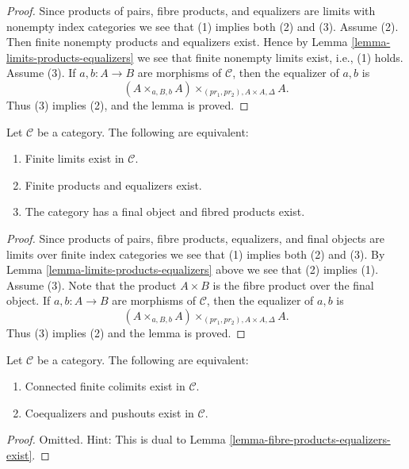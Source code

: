 \begin{proof}
Since products of pairs, fibre products, and equalizers are limits with
nonempty index categories we see that (1) implies both (2) and (3).
Assume (2). Then finite nonempty products and equalizers exist. Hence by
Lemma \ref{lemma-limits-products-equalizers}
we see that finite nonempty limits exist, i.e., (1) holds. Assume (3).
If $a, b : A \to B$ are morphisms of $\mathcal{C}$, then the
equalizer of $a, b$ is
$$
(A \times_{a, B, b} A)\times_{(pr_1, pr_2), A \times A, \Delta} A.
$$
Thus (3) implies (2), and the lemma is proved.
\end{proof}

\begin{lemma}
\label{lemma-finite-limits-exist}
Let $\mathcal{C}$ be a category.
The following are equivalent:
\begin{enumerate}
\item Finite limits exist in $\mathcal{C}$.
\item Finite products and equalizers exist.
\item The category has a final object and fibred products exist.
\end{enumerate}
\end{lemma}

\begin{proof}
Since products of pairs, fibre products, equalizers, and final objects
are limits over finite index categories we see that (1) implies both (2)
and (3). By
Lemma \ref{lemma-limits-products-equalizers}
above we see that (2) implies (1). Assume (3).
Note that the product $A \times B$ is the fibre product over the
final object. If $a, b : A \to B$ are morphisms of $\mathcal{C}$, then the
equalizer of $a, b$ is
$$
(A \times_{a, B, b} A)\times_{(pr_1, pr_2), A \times A, \Delta} A.
$$
Thus (3) implies (2) and the lemma is proved.
\end{proof}

\begin{lemma}
\label{lemma-push-outs-coequalizers-exist}
Let $\mathcal{C}$ be a category.
The following are equivalent:
\begin{enumerate}
\item Connected finite colimits exist in $\mathcal{C}$.
\item Coequalizers and pushouts exist in $\mathcal{C}$.
\end{enumerate}
\end{lemma}

\begin{proof}
Omitted. Hint: This is dual to
Lemma \ref{lemma-fibre-products-equalizers-exist}.
\end{proof}

